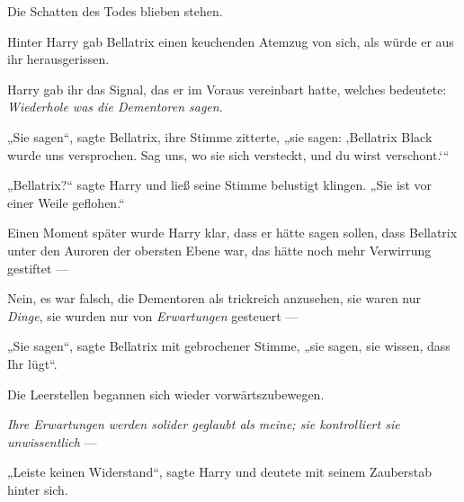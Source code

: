 Die Schatten des Todes blieben stehen.

Hinter Harry gab Bellatrix einen keuchenden Atemzug von sich, als würde er aus ihr herausgerissen.

Harry gab ihr das Signal, das er im Voraus vereinbart hatte, welches bedeutete: \emph{Wiederhole was die Dementoren sagen}.

„Sie sagen“, sagte Bellatrix, ihre Stimme zitterte, „sie sagen: ‚Bellatrix Black wurde uns versprochen. Sag uns, wo sie sich versteckt, und du wirst verschont.‘“

„Bellatrix?“ sagte Harry und ließ seine Stimme belustigt klingen.
„Sie ist vor einer Weile geflohen.“

Einen Moment später wurde Harry klar, dass er hätte sagen sollen, dass Bellatrix unter den Auroren der obersten Ebene war, das hätte noch mehr Verwirrung gestiftet —

Nein, es war falsch, die Dementoren als trickreich anzusehen, sie waren nur \emph{Dinge}, sie wurden nur von \emph{Erwartungen} gesteuert —

„Sie sagen“, sagte Bellatrix mit gebrochener Stimme, „sie sagen, sie wissen, dass Ihr lügt“.

Die Leerstellen begannen sich wieder vorwärtszubewegen.

\emph{Ihre Erwartungen werden solider geglaubt als meine; sie kontrolliert sie unwissentlich} —

„Leiste keinen Widerstand“, sagte Harry und deutete mit seinem Zauberstab hinter sich.

